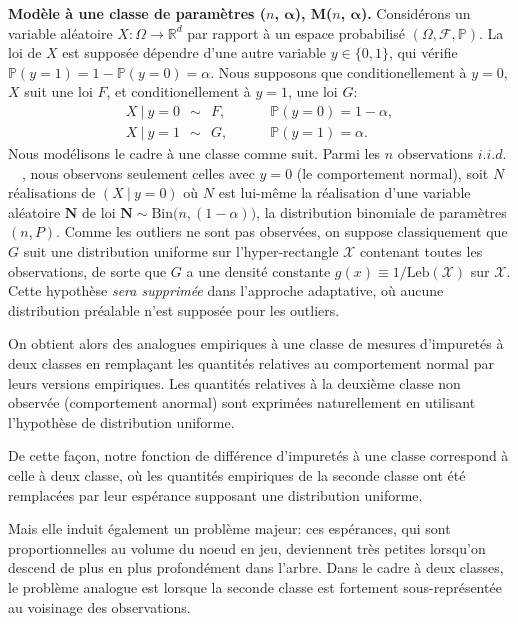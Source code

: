 \documentclass[a4paper, 12pt]{article}
\newcommand\iid{\ensuremath{\mathit{i.i.d.}}\ }
\def\mb{\mathbf}
\def\leb{\text{Leb}}
\begin{document}
\textbf{Modèle à une classe de paramètres ($n$, $\boldsymbol{\alpha}$), M($n$, $\boldsymbol{\alpha}$).}
Considérons un variable aléatoire $ X:\Omega \to \mathbb{R}^d$ par rapport à un espace probabilisé $(\Omega, \mathcal{F}, \mathbb{P})$.
La loi de $X$ est supposée dépendre d'une autre variable $y \in \{0,1\}$, qui vérifie $\mathbb{P}(y=1)=1-\mathbb{P}(y=0)=\alpha$. Nous supposons que conditionellement à $y=0$, $X$ suit une loi $F$, et conditionellement à $y=1$, une loi $G$:
\begin{align*}
 X ~|~ y=0 ~~\sim~~ F, &~~~~~~~~~~  \mathbb{P}(y=0)=1-\alpha, \\
 X ~|~ y=1 ~~\sim~~ G, &~~~~~~~~~~  \mathbb{P}(y=1)=\alpha.
\end{align*}
%
Nous modélisons le cadre à une classe comme suit. Parmi les $n$ observations \iid ~, nous observons seulement celles avec $y = 0$ (le comportement normal), soit $N$ réalisations de $ (X ~ | ~ y = 0)$ où $N$ est lui-même la réalisation d'une variable aléatoire $\mb N$ de loi $\mb N \sim \text{Bin}\big(n, (1-\alpha)\big)$, la distribution binomiale de paramètres $ (n, P)$. Comme les outliers ne sont pas observées, on suppose classiquement que $G$ suit une distribution uniforme sur l'hyper-rectangle $ \mathcal{X} $ contenant toutes les observations, de sorte que $ G $ a une densité constante $g(x) \equiv 1 / \leb(\mathcal{X})$ sur $\mathcal{X}$. Cette hypothèse \emph{sera supprimée} dans l'approche adaptative, où aucune distribution préalable n'est supposée pour les outliers.

On obtient alors des analogues empiriques à une classe de mesures d'impuretés à deux classes en remplaçant les quantités relatives au comportement normal par leurs versions empiriques. Les quantités relatives à la deuxième classe non observée (comportement anormal) sont exprimées naturellement en utilisant l'hypothèse de distribution uniforme.

De cette façon, notre fonction de différence d'impuretés à une classe correspond à celle à deux classe, où les quantités empiriques de la seconde classe ont été remplacées par leur espérance supposant une distribution uniforme.

Mais elle induit également un problème majeur: ces espérances, qui sont proportionnelles au volume du noeud en jeu, deviennent très petites lorsqu'on descend de plus en plus profondément dans l'arbre. Dans le cadre à deux classes, le problème analogue est lorsque la seconde classe est fortement sous-représentée au voisinage des observations.
\end{document}
